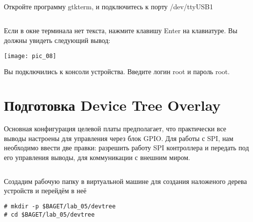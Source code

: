 \subsection{}Откройте программу gtkterm, и подключитесь к порту /dev/ttyUSB1

\subsection{}Если в окне терминала нет текста, нажмите клавишу Enter на клавиатуре. Вы должны увидеть следующий вывод:
\begin{center}
	\texttt{[image: pic\_08]}
\end{center}
Вы подключились к консоли устройства. Введите логин root и пароль root.


\section{Подготовка Device Tree Overlay}
Основная конфигурация целевой платы предполагает, что практически все выводы настроены для управления через блок GPIO. Для работы с SPI, нам необходимо ввести две правки: разрешить работу SPI контроллера и передать под его управления выводы, для коммуникации с внешним миром. 

\subsection{} Создадим рабочую папку в виртуальной машине для создания наложеного дерева устройств и перейдём в неё 
\begin{lstlisting}[style=bash]
# mkdir -p $BAGET/lab_05/devtree
# cd $BAGET/lab_05/devtree
\end{lstlisting}

